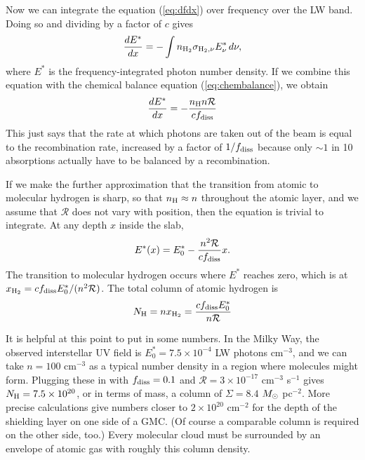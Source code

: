 Now we can integrate the equation (\ref{eq:dfdx}) over frequency over the LW band. Doing so and dividing by a factor of $c$ gives
\begin{equation}
\frac{dE^*}{dx} = -\int n_{{\rm H}_2} \sigma_{{\rm H}_2,\nu} E^*_{\nu}\, d\nu,
\end{equation}
where $E^*$ is the frequency-integrated photon number density. If we combine this equation with the chemical balance equation (\ref{eq:chembalance}), we obtain
\begin{equation}
\frac{dE^*}{dx} = -\frac{n_{\rm H} n \mathcal{R}}{c f_{\rm diss}}
\end{equation}
This just says that the rate at which photons are taken out of the beam is equal to the recombination rate, increased by a factor of $1/f_{\rm diss}$ because only $\sim 1$ in 10 absorptions actually have to be balanced by a recombination.

If we make the further approximation that the transition from atomic to molecular hydrogen is sharp, so that $n_{\rm H}\approx n$ throughout the atomic layer, and we assume that $\mathcal{R}$ does not vary with position, then the equation is trivial to integrate. At any depth $x$ inside the slab,
\begin{equation}
E^*(x) = E^*_0 - \frac{n^2\mathcal{R}}{c f_{\rm diss}} x.
\end{equation}
The transition to molecular hydrogen occurs where $E^*$ reaches zero, which is at $x_{{\rm H}_2}= c f_{\rm diss} E^*_0 / (n^2 \mathcal{R})$. The total column of atomic hydrogen is
\begin{equation}
N_{\rm H} = nx_{{\rm H}_2} = \frac{c f_{\rm diss} E^*_0}{n\mathcal{R}}
\end{equation}

It is helpful at this point to put in some numbers. In the Milky Way, the observed interstellar UV field is $E^*_0=7.5\times 10^{-4}$ LW photons cm$^{-3}$, and we can take $n=100$ cm$^{-3}$ as a typical number density in a region where molecules might form. Plugging these in with $f_{\rm diss}=0.1$ and $\mathcal{R}=3\times 10^{-17}$ cm$^{-3}$ s$^{-1}$ gives $N_{\rm H} = 7.5\times 10^{20}$, or in terms of mass, a column of $\Sigma=8.4$ $M_{\odot}$ pc$^{-2}$. More precise calculations give numbers closer to $2\times 10^{20}$ cm$^{-2}$ for the depth of the shielding layer on one side of a GMC. (Of course a comparable column is required on the other side, too.) Every molecular cloud must be surrounded by an envelope of atomic gas with roughly this column density.

